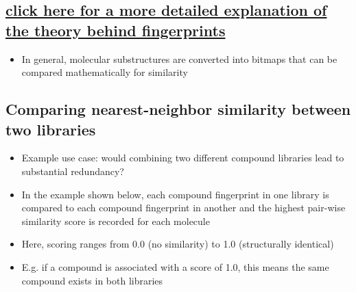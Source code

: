 \documentclass[a4paper,landscape,11pt]{article}
\providecommand{\tightlist}{%
      \setlength{\itemsep}{0pt}\setlength{\parskip}{0pt}}
\begin{document}
\subsection{\texorpdfstring{\href{https://www.daylight.com/dayhtml/doc/theory/theory.finger.html}{click
here for a more detailed explanation of the theory behind
fingerprints}}{click here for a more detailed explanation of the theory behind fingerprints}}\label{click-here-for-a-more-detailed-explanation-of-the-theory-behind-fingerprints}

\begin{itemize}
\tightlist
\item
  In general, molecular substructures are converted into bitmaps that
  can be compared mathematically for similarity
\end{itemize}

\subsection{Comparing nearest-neighbor similarity between two
libraries}\label{comparing-nearest-neighbor-similarity-between-two-libraries}

\begin{itemize}
\tightlist
\item
  Example use case: would combining two different compound libraries
  lead to substantial redundancy?
\item
  In the example shown below, each compound fingerprint in one library
  is compared to each compound fingerprint in another and the highest
  pair-wise similarity score is recorded for each molecule
\item
  Here, scoring ranges from 0.0 (no similarity) to 1.0 (structurally
  identical)
\item
  E.g. if a compound is associated with a score of 1.0, this means the
  same compound exists in both libraries
\end{itemize}
\end{document}
